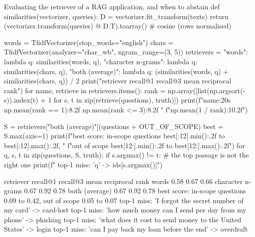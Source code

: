 \begin{pylisting}[label={lst:rag}]{Evaluating the retriever of a RAG application, and when to abstain}
def similarities(vectorizer, queries):
    D = vectorizer.fit_transform(texts)
    return (vectorizer.transform(queries) @ D.T).toarray()   # cosine (rows normalised)

words = TfidfVectorizer(stop_words="english")
chars = TfidfVectorizer(analyzer="char_wb", ngram_range=(3, 5))
retrievers = {"words": lambda q: similarities(words, q),
              "character n-grams": lambda q: similarities(chars, q),
              "both (average)": lambda q: (similarities(words, q)
                                           + similarities(chars, q)) / 2}
print("retriever            recall@1  recall@3  mean reciprocal rank")
for name, retrieve in retrievers.items():
    rank = np.array([list(np.argsort(-s)).index(t) + 1
                     for s, t in zip(retrieve(questions), truth)])
    print(f"{name:20s} {np.mean(rank == 1):8.2f}  {np.mean(rank <= 3):8.2f}  "
          f"{np.mean(1 / rank):10.2f}")

S = retrievers["both (average)"](questions + OUT_OF_SCOPE)
best = S.max(axis=1)
print(f"best score: in-scope questions {best[:12].min():.2f} to {best[:12].max():.2f}, "
      f"out of scope {best[12:].min():.2f} to {best[12:].max():.2f}")
for q, s, t in zip(questions, S, truth):
    if s.argmax() != t:                      # the top passage is not the right one
        print(f"  top-1 miss: '{q}' -> {ids[s.argmax()]}")
\end{pylisting}
\begin{pyoutput}
retriever            recall@1  recall@3  mean reciprocal rank
words                    0.58      0.67        0.66
character n-grams        0.67      0.92        0.78
both (average)           0.67      0.92        0.78
best score: in-scope questions 0.09 to 0.42, out of scope 0.05 to 0.07
  top-1 miss: 'I forgot the secret number of my card' -> card-lost
  top-1 miss: 'how much money can I send per day from my phone' -> phishing
  top-1 miss: 'what does it cost to send money to the United States' -> login
  top-1 miss: 'can I pay back my loan before the end' -> overdraft
\end{pyoutput}

